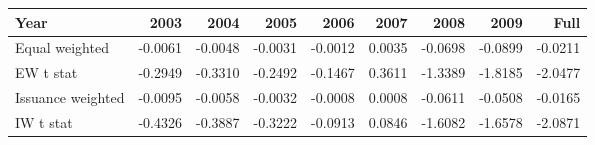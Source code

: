 \begin{tabular}{l|rrrrrrrr}
\toprule
Year & 2003 & 2004 & 2005 & 2006 & 2007 & 2008 & 2009 & Full \\
\midrule
Equal weighted & -0.0061 & -0.0048 & -0.0031 & -0.0012 & 0.0035 & -0.0698 & -0.0899 & -0.0211 \\
EW t stat & -0.2949 & -0.3310 & -0.2492 & -0.1467 & 0.3611 & -1.3389 & -1.8185 & -2.0477 \\
Issuance weighted & -0.0095 & -0.0058 & -0.0032 & -0.0008 & 0.0008 & -0.0611 & -0.0508 & -0.0165 \\
IW t stat & -0.4326 & -0.3887 & -0.3222 & -0.0913 & 0.0846 & -1.6082 & -1.6578 & -2.0871 \\
\bottomrule
\end{tabular}
